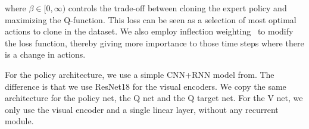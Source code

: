 where $\beta \in [0, \infty)$ controls the trade-off between cloning the expert policy and maximizing the Q-function.
This loss can be seen as a selection of most optimal actions to clone in the dataset.
We also employ inflection weighting~\cite{wijmans2019} to modify the loss function, thereby giving more importance to those time steps where there is a change in actions.

For the policy architecture, we use a simple CNN+RNN model from\cite{ramrakhya2023}.
The difference is that we use ResNet18 for the visual encoders.
We copy the same architecture for the policy net, the Q net and the Q target net.
For the V net, we only use the visual encoder and a single linear layer, without any recurrent module.


